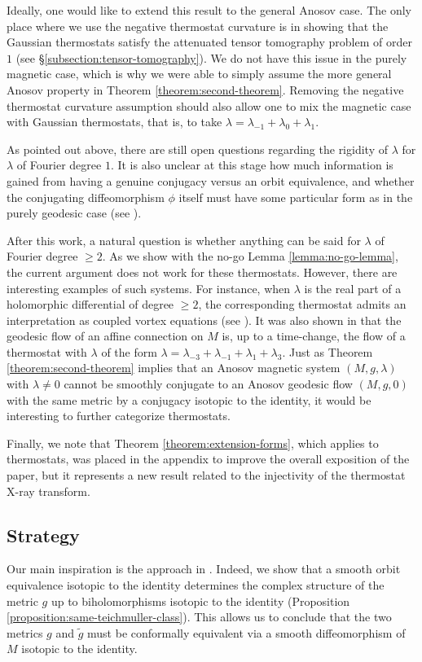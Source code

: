\documentclass[reqno,12pt,letterpaper]{amsart}
\theoremstyle{definition}
\theoremstyle{remark}
\theoremstyle{definition}
\numberwithin{equation}{section}
\begin{document}
Ideally, one would like to extend this result to the general Anosov case. The only place where we use the negative thermostat curvature is in showing that the Gaussian thermostats satisfy the attenuated tensor tomography problem of order $1$ (see \S\ref{subsection:tensor-tomography}). We do not have this issue in the purely magnetic case, which is why we were able to simply assume the more general Anosov property in Theorem \ref{theorem:second-theorem}. Removing the negative thermostat curvature assumption should also allow one to mix the magnetic case with Gaussian thermostats, that is, to take $\lambda=\lambda_{-1}+\lambda_0+\lambda_1$. 

As pointed out above, there are still open questions regarding the rigidity of $\lambda$ for $\lambda$ of Fourier degree $1$. It is also unclear at this stage how much information is gained from having a genuine conjugacy versus an orbit equivalence, and whether the conjugating  diffeomorphism  $\phi$ itself must have some particular form as in the purely geodesic case (see \cite[Corollary 1.3]{guillarmou25}).

After this work, a natural question is whether anything can be said for $\lambda$ of Fourier degree $\geq 2$. As we show with the no-go Lemma \ref{lemma:no-go-lemma}, the current argument does not work for these thermostats. However, there are interesting examples of such systems. For instance, when $\lambda$ is the real part of a holomorphic differential of degree $\geq 2$, the corresponding thermostat admits an interpretation as coupled vortex equations (see \cite{mettler19, mettler22}). It was also shown in \cite{mettler20} that the geodesic flow of an affine connection on $M$ is, up to a time-change, the flow of a thermostat with $\lambda$ of the form $\lambda=\lambda_{-3}+\lambda_{-1}+\lambda_1+\lambda_3$. Just as Theorem \ref{theorem:second-theorem} implies that an Anosov magnetic system $(M, g, \lambda)$ with $\lambda\neq 0$ cannot be smoothly conjugate to an Anosov geodesic flow $(M, g, 0)$ with the same metric by a conjugacy isotopic to the identity, it would be interesting to further categorize thermostats. 

Finally, we note that Theorem \ref{theorem:extension-forms}, which applies to thermostats, was placed in the appendix to improve the overall exposition of the paper, but it represents a new result related to the injectivity of the thermostat X-ray transform. 

\subsection{Strategy} Our main inspiration is the approach in \cite{guillarmou25}. Indeed, we show that a smooth orbit equivalence isotopic to the identity determines the complex structure of the metric $g$ up to biholomorphisms isotopic to the identity (Proposition \ref{proposition:same-teichmuller-class}). This allows us to conclude that the two metrics $g$ and $\tilde{g}$ must be conformally equivalent via a smooth diffeomorphism of $M$ isotopic to the identity. 
\end{document}

